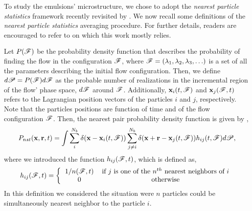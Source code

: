 
To study the emulsions' microstructure, we chose to adopt the \textit{nearest particle statistics} framework recently revisited by \citet{zhang2021ensemble}.
We now recall some definitions of the \textit{nearest particle statistics} averaging procedure. 
For further details, readers are encouraged to refer to \citet{zhang2023evolution} on which this work mostly relies.

Let $P(\mathscr{F})$ be the probability density function that describes the probability of finding the flow in the configuration $\mathscr{F}$, where $\mathscr{F} = (\lambda_1,\lambda_2,\lambda_3,\ldots)$ is a set of all the parameters describing the initial flow configuration.
Then, we define $d\mathscr{P} = P(\mathscr{F})d\mathscr{F}$ as the probable number of realizations in the incremental region of the flow' phase space, $d\mathscr{F}$ around $\mathscr{F}$.
Additionally,  $\textbf{x}_i(t,\mathscr{F})$ and $\textbf{x}_j(\mathscr{F},t)$ refers to the Lagrangian position vectors of the particles $i$ and $j$, respectively. 
Note that the particles positions are function of time and of the flow configuration $\mathscr{F}$. 
Then, the nearest pair probability density function is given by \citep{zhang2021ensemble,zhang2023evolution},
\begin{equation}
    P_{nst}(\textbf{x},\textbf{r},t)= 
    \int \sum_{i}^{N_b}\delta(\textbf{x}-\textbf{x}_i(t,\mathscr{F}))
    \sum_{j\neq i}^{N_b}\delta(\textbf{x}+\textbf{r}-\textbf{x}_j(t,\mathscr{F})) 
    h_{ij} (t,\mathscr{F})
    d\mathscr{P},
    \label{eq:P_nstij}
\end{equation}
where we introduced the function $h_{ij}(\mathscr{F},t)$, which is defined as,
\begin{equation*}
    h_{ij}(\FF,t)
    = \left\{
        \begin{tabular}{cc}
            $1/n(\FF,t)$ & if $j$ is one of the $n^{th}$ nearest neighbors of $i$ \\
            0& otherwise
        \end{tabular}
        \right.
\end{equation*}
In this definition we considered the situation were $n$ particles could be simultaneously nearest neighbor to the particle $i$. 
